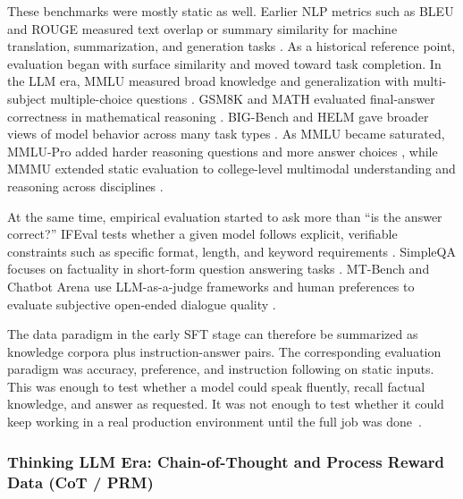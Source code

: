 These benchmarks were mostly static as well. Earlier NLP metrics such as BLEU and ROUGE measured text overlap or summary similarity for machine translation, summarization, and generation tasks \citep{papineni2002bleu,lin2004rouge}. As a historical reference point, evaluation began with surface similarity and moved toward task completion. In the LLM era, MMLU measured broad knowledge and generalization with multi-subject multiple-choice questions \citep{hendrycks2020mmlu}. GSM8K and MATH evaluated final-answer correctness in mathematical reasoning \citep{cobbe2021gsm8k,hendrycks2021math}. BIG-Bench and HELM gave broader views of model behavior across many task types \citep{srivastava2022bigbench,liang2022helm}. As MMLU became saturated, MMLU-Pro added harder reasoning questions and more answer choices \citep{wang2024mmlupro}, while MMMU extended static evaluation to college-level multimodal understanding and reasoning across disciplines \citep{yue2023mmmu,xu2025trajectory,xu2025agenttrek,pang2024kalm,wang2025steca,nguyen2024dynasaur,wang2025x}.

At the same time, empirical evaluation started to ask more than ``is the answer correct?'' IFEval tests whether a given model follows explicit, verifiable constraints such as specific format, length, and keyword requirements \citep{zhou2023ifeval}. SimpleQA focuses on factuality in short-form question answering tasks \citep{wei2024simpleqa}. MT-Bench and Chatbot Arena use LLM-as-a-judge frameworks and human preferences to evaluate subjective open-ended dialogue quality \citep{zheng2023judging,wang2026autotraces,hoang2025lam,ma2024agentboard,li2024embodied,mohammadi2025evaluation}.

The data paradigm in the early SFT stage can therefore be summarized as knowledge corpora plus instruction-answer pairs. The corresponding evaluation paradigm was accuracy, preference, and instruction following on static inputs. This was enough to test whether a model could speak fluently, recall factual knowledge, and answer as requested. It was not enough to test whether it could keep working in a real production environment until the full job was done~\citep{chen2025solving,cao2025survey,cao2026beyond,lu2025agentrewardbench,gioacchini2024agentquest}.



\subsubsection{Thinking LLM Era: Chain-of-Thought and Process Reward Data (CoT / PRM)}


